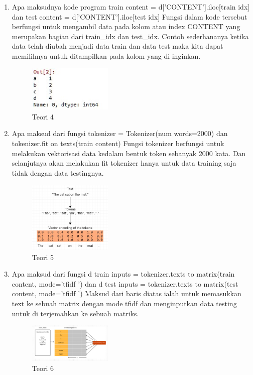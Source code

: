 \begin{enumerate}
\item Apa maksudnya kode program train content = d[’CONTENT’].iloc[train idx] dan test content = d[’CONTENT’].iloc[test idx]
\hfill\break
Fungsi dalam kode tersebut berfungsi untuk mengambil data pada kolom atau index CONTENT yang merupakan bagian dari train\_idx dan test\_idx. Contoh sederhananya ketika data telah diubah menjadi data train dan data test maka kita dapat memilihnya untuk ditampilkan pada kolom yang di inginkan. 

\begin{figure}[H]
\centering
	\includegraphics[width=4cm]{figures/1174075/7/4.jpg}
\caption{Teori 4}
\end{figure}

\item Apa maksud dari fungsi tokenizer = Tokenizer(num words=2000) dan tokenizer.fit on texts(train content)
\hfill\break
Fungsi tokenizer berfungsi untuk melakukan vektorisasi data kedalam bentuk token sebanyak 2000 kata. Dan selanjutnya akan melakukan fit tokenizer hanya untuk data training saja tidak dengan data testingnya.
\begin{figure}[H]
\centering
	\includegraphics[width=4cm]{figures/1174075/7/5.jpg}
\caption{Teori 5}
\end{figure}

\item Apa maksud dari fungsi d train inputs = tokenizer.texts to matrix(train content, mode=’tfidf ’) dan d test inputs = tokenizer.texts to matrix(test content, mode=’tfidf ’)
\hfill\break
Maksud dari baris diatas ialah untuk memasukkan text ke sebuah matrix dengan mode tfidf dan menginputkan data testing untuk di terjemahkan ke sebuah matriks.
\begin{figure}[H]
\centering
	\includegraphics[width=4cm]{figures/1174075/7/6.jpg}
\caption{Teori 6}
\end{figure}


\end{enumerate}
